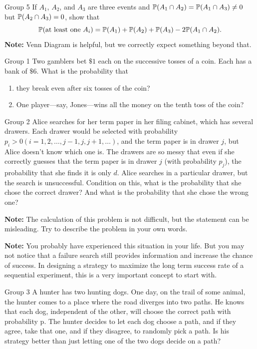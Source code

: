 \documentclass{article}
\begin{document}
\begin{problem}
    {Group 5}
    If $A_1$, $A_2$, and $A_3$ are three events and $\P{A_1\cap A_2}=\P{A_1\cap A_3}\neq0$ but $\P{A_2\cap A_3}=0$, show that
    \[\P{\text{at least one}\ A_i}=\P{A_1}+\P{A_2}+\P{A_3}-2\P{A_1\cap A_2}.\]
    \textbf{Note:} Venn Diagram is helpful, but we correctly expect something beyond that.
\end{problem}
\fi
\iffalse
\begin{problem}
    {Group 1}
    Two gamblers bet $\$1$ each on the successive tosses of a coin. Each has a bank of $\$6$. What is the probability that
    \begin{enumerate}
        \item they break even after six tosses of the coin?
        \item One player—say, Jones—wins all the money on the tenth toss of the coin?
    \end{enumerate}
\end{problem}

\begin{problem}
    {Group 2}
    Alice searches for her term paper in her filing cabinet, which has several drawers. Each drawer would be selected with probability $p_i>0 (i=1,2,\ldots,j-1,j,j+1,\ldots)$, and the term paper is in drawer $j$, but Alice doesn't know which one is. The drawers are so messy that even if she correctly guesses that the term paper is in drawer $j$ (\ie with probability $p_j$), the probability that she finds it is only $d$. Alice searches in a particular drawer, but the search is unsuccessful. Condition on this, what is the probability that she chose the correct drawer? And what is the probability that she chose the wrong one?

    \textbf{Note:} The calculation of this problem is not difficult, but the statement can be misleading. Try to describe the problem in your own words.

    \textbf{Note:} You probably have experienced this situation in your life. But you may not notice that a failure search still provides information and increase the chance of success. In designing a strategy to maximize the long term success rate of a sequential experiment, this is a very important concept to start with.
\end{problem}

\begin{problem}
    {Group 3}
    A hunter has two hunting dogs. One day, on the trail of some animal, the hunter comes to a place where the road diverges into two paths. He knows that each dog, independent of the other, will choose the correct path with probability p. The hunter decides to let each dog choose a path, and if they agree, take that one, and if they disagree, to randomly pick a path. Is his strategy better than just letting one of the two dogs decide on a path?
\end{problem}
\end{document}
